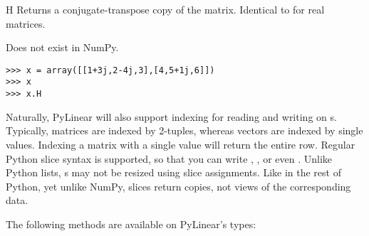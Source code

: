 \begin{memberdesc}[Matrix]{H}
  Returns a conjugate-transpose copy of the matrix.
  Identical to  for real matrices.

  Does not exist in NumPy.
\begin{verbatim}
>>> x = array([[1+3j,2-4j,3],[4,5+1j,6]])
>>> x
>>> x.H
\end{verbatim}
\end{memberdesc}

Naturally, PyLinear will also support indexing for reading and writing
on s. Typically, matrices are indexed by 2-tuples,
whereas vectors are indexed by single values. Indexing a matrix with a
single value will return the entire row. Regular Python slice syntax
is supported, so that you can write , ,
or even . Unlike Python lists, s may not be
resized using slice assignments. Like in the rest of Python, yet
unlike NumPy, slices return copies, not views of the corresponding
data.

The following methods are available on PyLinear's  types:

